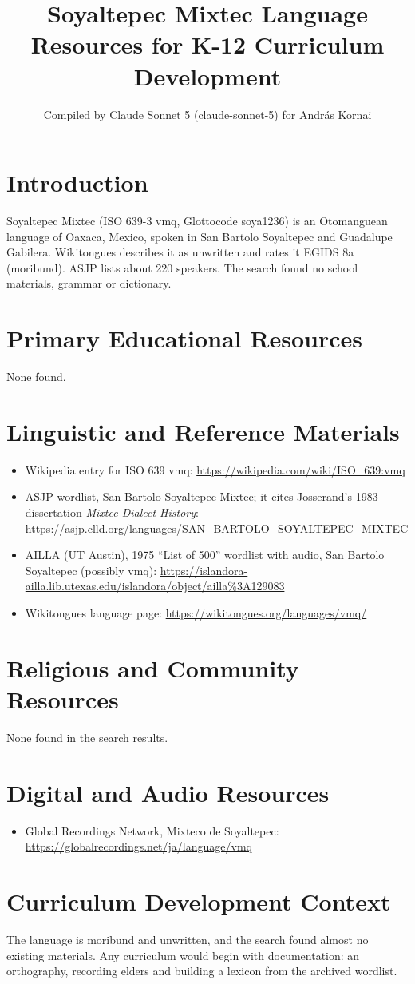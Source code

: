 \documentclass[12pt]{article}
\title{Soyaltepec Mixtec Language Resources for K-12 Curriculum Development}
\author{Compiled by Claude Sonnet 5 (claude-sonnet-5) for Andr\'as Kornai}
\date{}
\begin{document}
\maketitle
\section{Introduction}
Soyaltepec Mixtec (ISO 639-3 vmq, Glottocode soya1236) is an Otomanguean language of Oaxaca, Mexico, spoken in San Bartolo Soyaltepec and Guadalupe Gabilera. Wikitongues describes it as unwritten and rates it EGIDS 8a (moribund). ASJP lists about 220 speakers. The search found no school materials, grammar or dictionary.
\section{Primary Educational Resources}
None found.
\section{Linguistic and Reference Materials}
\begin{itemize}
\item Wikipedia entry for ISO 639 vmq: \url{https://wikipedia.com/wiki/ISO_639:vmq}
\item ASJP wordlist, San Bartolo Soyaltepec Mixtec; it cites Josserand's 1983 dissertation \emph{Mixtec Dialect History}: \url{https://asjp.clld.org/languages/SAN_BARTOLO_SOYALTEPEC_MIXTEC}
\item AILLA (UT Austin), 1975 ``List of 500'' wordlist with audio, San Bartolo Soyaltepec (possibly vmq): \url{https://islandora-ailla.lib.utexas.edu/islandora/object/ailla%3A129083}
\item Wikitongues language page: \url{https://wikitongues.org/languages/vmq/}
\end{itemize}
\section{Religious and Community Resources}
None found in the search results.
\section{Digital and Audio Resources}
\begin{itemize}
\item Global Recordings Network, Mixteco de Soyaltepec: \url{https://globalrecordings.net/ja/language/vmq}
\end{itemize}
\section{Curriculum Development Context}
The language is moribund and unwritten, and the search found almost no existing materials. Any curriculum would begin with documentation: an orthography, recording elders and building a lexicon from the archived wordlist.
\end{document}
